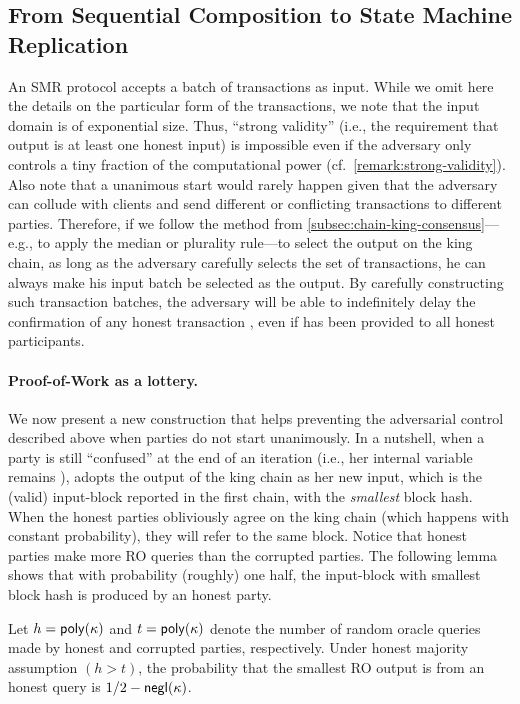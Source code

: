 \subsection{From Sequential Composition to State Machine Replication}
\label{subsec:fast-state-machine-replication}

An SMR protocol accepts a batch of transactions as input.
%
While we omit here the details on the particular form of the transactions, we note that the input domain is of exponential size.
%
Thus, ``strong validity'' (i.e., the requirement that output is at least one honest input) is impossible even if the adversary only controls a tiny fraction of the computational power (cf.~\cref{remark:strong-validity}).
%
Also note that a unanimous start would rarely happen given that the adversary can collude with clients and send different or conflicting transactions to different parties.
%
Therefore, if we follow the method from \cref{subsec:chain-king-consensus}---e.g., to apply the median or plurality rule---to select the output on the king chain, as long as the adversary carefully selects the set of transactions, he can always make his input batch be selected as the output.
%
By carefully constructing such transaction batches, the adversary will be able to indefinitely delay the confirmation of any honest transaction \tx, even if \tx has been provided to all honest participants.

\paragraph{Proof-of-Work as a lottery.}
%
We now present a new construction that helps preventing the adversarial control described above when parties do not start unanimously.
%
In a nutshell, when a party \party is still ``confused'' at the end of an iteration (i.e., her internal variable \lock remains \false), \party adopts the output of the king chain as her new input, which is the (valid) input-block reported in the first chain, with the  \emph{smallest} block hash.
%
When the honest parties obliviously agree on the king chain (which happens with constant probability), they will refer to the same block.
%
Notice that honest parties make more RO queries than the corrupted parties.
%
The following lemma shows that with probability (roughly) one half, the input-block with smallest block hash is produced by an honest party.

\begin{lemma} \label{lemma:smallest-hash}
    Let $h = \mathsf{poly}(\kappa)$ and $t = \mathsf{poly}(\kappa)$ denote the number of random oracle queries made by honest and corrupted parties, respectively.
    Under honest majority assumption $(h > t)$, the probability that the smallest RO output is from an honest query is $1 / 2 - \mathsf{negl}(\kappa)$.
\end{lemma}

